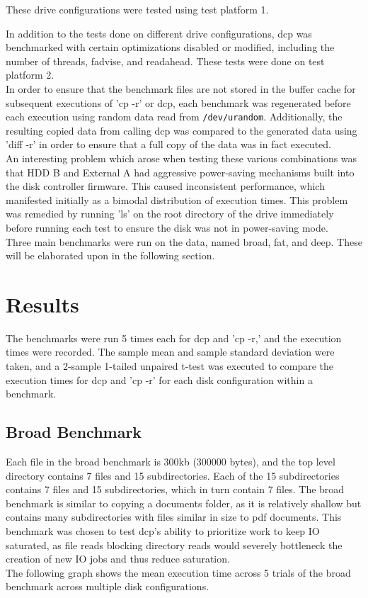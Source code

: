 \documentclass[12pt]{article}
\begin{document}
\noindent
These drive configurations were tested using test platform 1.

In addition to the tests done on different drive configurations,
dcp was benchmarked with certain optimizations disabled or modified, including
the number of threads, fadvise, and readahead. These tests were done on test platform 2.\\

In order to ensure that the benchmark files are not stored in the buffer cache
for subsequent executions of 'cp -r' or dcp, each benchmark was regenerated
before each execution using random data read from \texttt{/dev/urandom}.
Additionally, the resulting copied data from calling dcp
was compared to the generated data using 'diff -r' in order to
ensure that a full copy of the data was in fact executed.\\

An interesting problem which arose when testing these various combinations
was that HDD B and External A had aggressive power-saving mechanisms built into the
disk controller firmware. This caused inconsistent performance, which
manifested initially as a bimodal distribution of execution times. This
problem was remedied by running 'ls' on the root directory of the
drive immediately before running each test to ensure the disk was not in power-saving
mode.\\

Three main benchmarks were run on the data, named broad, fat, and deep.
These will be elaborated upon in the following section.\\

\section{Results}
The benchmarks were run 5 times each for dcp and 'cp -r,' and the execution
times were recorded. The sample mean and sample standard deviation were taken,
and a 2-sample 1-tailed unpaired t-test was executed to compare the execution
times for dcp and 'cp -r' for each disk configuration within a benchmark.\\

\subsection{Broad Benchmark}
Each file in the broad benchmark is 300kb (300000 bytes), and
the top level directory contains 7 files and 15 subdirectories. Each of the 15 subdirectories
contains 7 files and 15 subdirectories, which in turn contain 7 files.
The broad benchmark is similar to copying a  documents folder, as it is
relatively shallow but contains many subdirectories with files similar in size to
pdf documents. This benchmark was chosen to test dcp's ability to prioritize work
to keep IO saturated, as file reads blocking directory reads would severely bottleneck
the creation of new IO jobs and thus reduce saturation.\\
\noindent
The following graph shows the mean execution time across 5 trials of the broad benchmark across multiple disk configurations.
\vspace{5mm}
\end{document}
